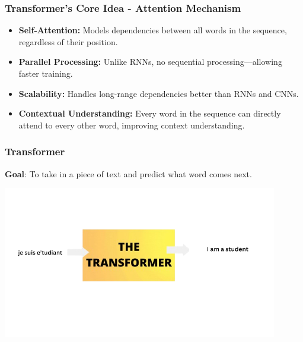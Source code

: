 \documentclass{beamer}
\begin{document}
\begin{frame}
    \frametitle{Transformer’s Core Idea - Attention Mechanism}
    \begin{itemize}
        \item \textbf{Self-Attention:} Models dependencies between all words in the sequence, regardless of their position.
        \pause
        \item \textbf{Parallel Processing:} Unlike RNNs, no sequential processing—allowing faster training.
        \pause
        \item \textbf{Scalability:} Handles long-range dependencies better than RNNs and CNNs.
        \pause
        \item \textbf{Contextual Understanding:} Every word in the sequence can directly attend to every other word, improving context understanding.
    \end{itemize}
\end{frame}


\begin{frame}
    \frametitle{Transformer}
     
        \large \textbf{Goal}: To take in a piece of text and predict what word comes next.\\
    
    \begin{center}
        \includegraphics[width=12cm]{je_suis_e_tudiant__2_-removebg-preview.png}
       
    \end{center}
\end{frame}
\end{document}
